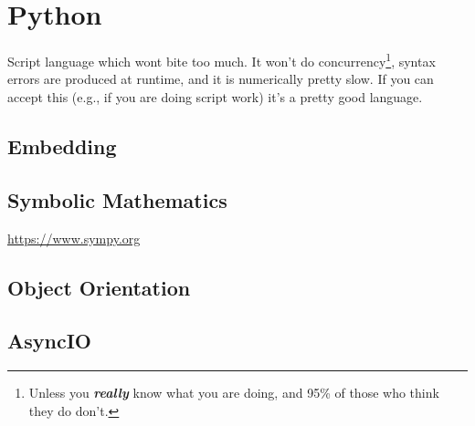 \section{Python}

Script language which wont bite too much. It won't do concurrency\footnote{Unless you \textsl{\textbf{really}} know what you are doing, and 95\% of those who think they do don't.}, syntax errors are produced at runtime, and it is numerically pretty slow. If you can accept this (e.g., if you are doing script work) it's a pretty good language.

\subsection{Embedding}

\subsection{Symbolic Mathematics}

\url{https://www.sympy.org}

\subsection{Object Orientation}

\subsection{AsyncIO}

